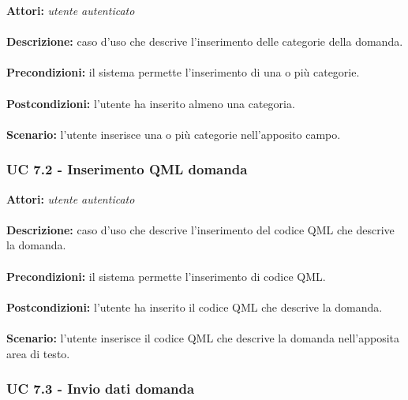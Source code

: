 \documentclass[a4paper,11pt]{article}
\begin{document}
\textbf{Attori:} \textit{utente autenticato}
\\ \\
\textbf{Descrizione:} caso d'uso che descrive l'inserimento delle categorie della domanda.\\
\\
\textbf{Precondizioni:} il sistema permette l'inserimento di una o più categorie.\\
\\
\textbf{Postcondizioni:} l’utente ha inserito almeno una categoria.\\
\\
\textbf{Scenario:} l’utente inserisce una o più categorie nell'apposito campo.\\


\subsubsection{UC 7.2 - Inserimento QML domanda}

\textbf{Attori:} \textit{utente autenticato}
\\ \\
\textbf{Descrizione:} caso d'uso che descrive l'inserimento del codice QML che descrive la domanda.\\
\\
\textbf{Precondizioni:} il sistema permette l'inserimento di codice QML.\\
\\
\textbf{Postcondizioni:} l’utente ha inserito il codice QML che descrive la domanda.\\
\\
\textbf{Scenario:} l’utente inserisce il codice QML che descrive la domanda nell'apposita area di testo.\\


\subsubsection{UC 7.3 - Invio dati domanda}
\end{document}
